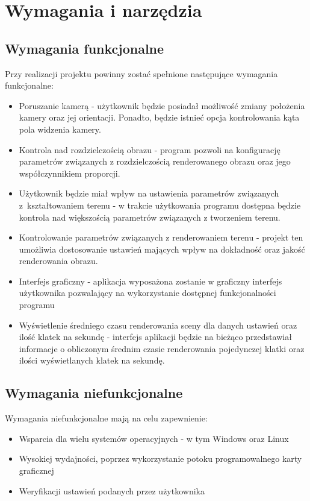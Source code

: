 \chapter{Wymagania i narzędzia}
\label{ch:wymagania-i-narzedzia}

\section{Wymagania funkcjonalne}
Przy realizacji projektu powinny zostać spełnione następujące wymagania funkcjonalne:
\begin{itemize}
\item Poruszanie kamerą -
  użytkownik będzie posiadał możliwość zmiany położenia kamery oraz jej orientacji. Ponadto, będzie istnieć opcja kontrolowania kąta pola widzenia kamery.
\item Kontrola nad rozdzielczością obrazu -
  program pozwoli na konfigurację parametrów związanych z rozdzielczością renderowanego obrazu oraz jego współczynnikiem proporcji.
\item Użytkownik będzie miał wpływ na ustawienia parametrów związanych z~kształtowaniem terenu -
  w trakcie użytkowania programu dostępna będzie kontrola nad większością parametrów związanych z tworzeniem terenu.
\item Kontrolowanie parametrów związanych z renderowaniem terenu -
  projekt ten umożliwia dostosowanie ustawień mających wpływ
  na dokładność oraz jakość renderowania obrazu.
\item Interfejs graficzny -
  aplikacja wyposażona zostanie w graficzny interfejs użytkownika pozwalający na wykorzystanie dostępnej funkcjonalności programu

\item Wyświetlenie średniego czasu renderowania sceny dla danych ustawień oraz ilość klatek na sekundę -
  interfejs aplikacji będzie na bieżąco przedstawiał informacje o obliczonym średnim czasie renderowania pojedynczej klatki oraz ilości wyświetlanych klatek na sekundę.

\end{itemize}


\section{Wymagania niefunkcjonalne}
Wymagania niefunkcjonalne mają na celu zapewnienie:
\begin{itemize}
\item Wsparcia dla wielu systemów operacyjnych - w tym Windows oraz Linux
\item Wysokiej wydajności, poprzez wykorzystanie potoku programowalnego karty graficznej
\item Weryfikacji ustawień podanych przez użytkownika
\end{itemize}

